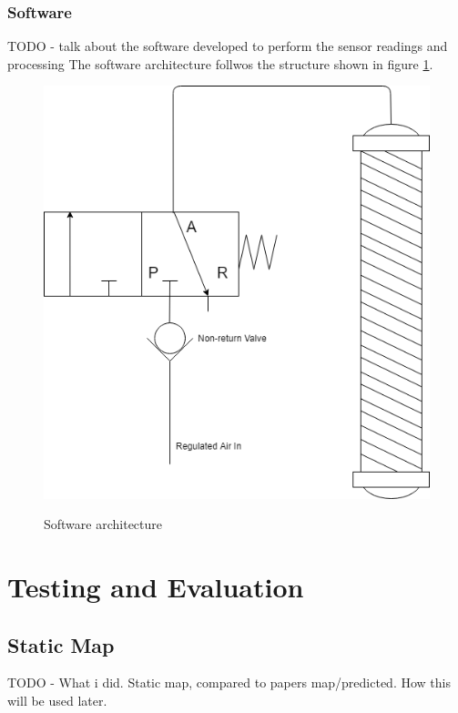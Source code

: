 \documentclass[11pt,a4paper]{article}
\begin{document}
\subsubsection{Software}
\label{sub:software}
\newline TODO - talk about the software developed to perform the sensor readings and processing
The software architecture follwos the structure shown in figure \ref{fig:software_arch}.

\begin{figure}[hbt!]
    \centering
    \caption{Software architecture}
    \includegraphics[scale=0.3]{Pneumatic_Design.png}
    \label{fig:software_arch}
\end{figure}

\newpage
\section{Testing and Evaluation}
\label{sec:results}

\subsection{Static Map}
\label{sub:static_map}
TODO - What i did. Static map, compared to papers map/predicted. How this will be used later.
\end{document}
